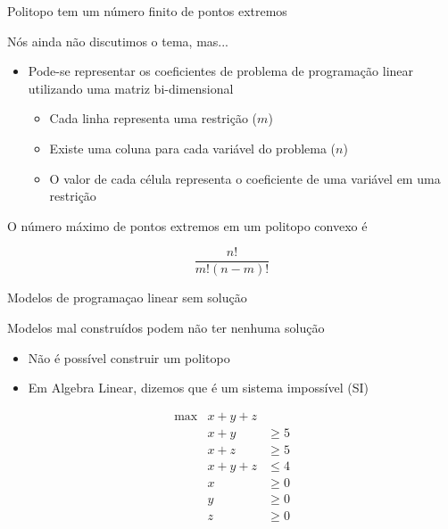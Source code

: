 \documentclass[compress,mathserif]{beamer}
\begin{document}

\begin{frame}{Politopo tem um número finito de pontos extremos}

Nós ainda não discutimos o tema, mas...
\begin{itemize}
    \item Pode-se representar os coeficientes de problema de programação linear utilizando uma matriz bi-dimensional
    \begin{itemize}
        \item Cada linha representa uma restrição ($m$)
        \item Existe uma coluna para cada variável do problema ($n$)
        \item O valor de cada célula representa o coeficiente de uma variável em uma restrição
    \end{itemize}
\end{itemize}

\vspace{0.5cm}

O número máximo de pontos extremos em um politopo convexo é

$$\frac{n!}{m!(n-m)!}$$

\end{frame}


\begin{frame}{Modelos de programaçao linear sem solução}

Modelos mal construídos podem não ter nenhuma solução
\begin{itemize}
    \item Não é possível construir um politopo
    \item Em Algebra Linear, dizemos que é um sistema impossível (SI)
\end{itemize}

\vspace{0.5cm}

$$\begin{matrix}
        \max & x + y + z\\ 
             & x + y & \geq 5 \\
             & x + z & \geq 5 \\
             & x + y + z & \leq 4 \\
             & x & \geq 0 \\
             & y & \geq 0 \\
             & z & \geq 0
        \end{matrix}    
$$

\end{frame}
\end{document}
